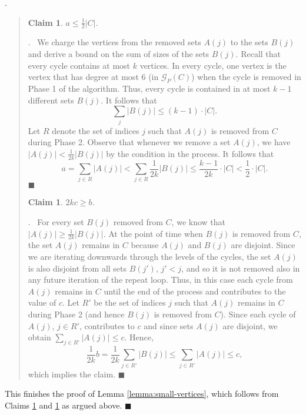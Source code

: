 \documentclass[11pt]{article}
\newenvironment{proof}{\noindent {\bf Proof}.\ }{\qed \par\vskip 4mm\par}
\newtheorem{claim}[theorem]{Claim}
\newcommand{\sq}{\hbox{\rlap{$\sqcap$}$\sqcup$}}
\newcommand{\qed}{\hspace*{\fill}\sq}
\renewcommand{\qed}{\hspace*{\fill}\ensuremath{\blacksquare}}
\begin{document}
\begin{proof}
\begin{quote}

\begin{claim}
\label{claim:a}
$a \le \frac12 |C|$.
\end{claim}

\begin{proof}
We charge the vertices from the removed sets $A(j)$ to the sets $B(j)$ and derive a bound on the sum of sizes of the sets $B(j)$. Recall that every cycle contains at most $k$ vertices. In every cycle, one vertex is the vertex that has degree at most
{6 (in $\mathcal G_P(C)$)}
when the cycle is removed in Phase 1 of the algorithm. Thus, every cycle is contained in at most $k-1$ different sets $B(j)$. It follows that
\begin{displaymath}
    \sum_{j} |B(j)| \le (k-1) \cdot |C|.
\end{displaymath}
Let $R$ denote the set of indices $j$ such that $A(j)$ is removed from $C$ during Phase 2. Observe that whenever we remove a set $A(j)$, we have $|A(j)| < \frac{1}{2k} |B(j)|$ by the condition in the process. It follows that
\begin{displaymath}
    a =
    \sum_{j \in R} |A(j)| <
    \sum_{j \in R} \frac{1}{2k} |B(j)| \le
    \frac{k-1}{2k} \cdot |C| <
    \frac{1}{2} \cdot |C|.
\end{displaymath}
\end{proof}

\begin{claim}
\label{claim:b}
$2 k c \ge b$.
\end{claim}

\begin{proof}
For every set $B(j)$ removed from $C$, we know that $|A(j)| \ge \frac{1}{2k} |B(j)|$. At the point of time when $B(j)$ is removed from $C$, the set $A(j)$ remains in $C$ because $A(j)$ and $B(j)$ are disjoint. Since we are iterating downwards through the levels of the cycles, the set $A(j)$ is also disjoint from all sets $B(j')$, $j'<j$, and so it is not removed also in any future iteration of the repeat loop. Thus, in this case each cycle from $A(j)$ remains in $C$ until the end of the process and contributes to the value of $c$. Let $R'$ be the set of indices $j$ such that $A(j)$ remains in $C$ during Phase 2 (and hence $B(j)$ is removed from $C$). Since each cycle of $A(j)$, $j\in R'$, contributes to $c$ and since sets $A(j)$ are disjoint, we obtain $\sum_{j\in R'} |A(j)| \le c$. Hence,
\begin{displaymath}
    \frac{1}{2k} b =
    \frac{1}{2k} \sum_{j\in R'} |B(j)| \le
    \sum_{j\in R'} |A(j)| \le
    c,
\end{displaymath}
which implies the claim.
\end{proof}
\end{quote}

This finishes the proof of Lemma \ref{lemma:small-vertices}, which follows from Claims \ref{claim:a} and \ref{claim:b} as argued above.
\end{proof}
\end{document}
